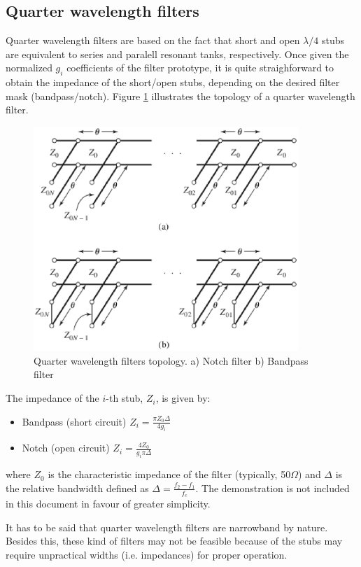\subsection{Quarter wavelength filters}

Quarter wavelength filters are based on the fact that short and open $\lambda/4$ stubs are equivalent to series and paralell resonant tanks, respectively. Once given the normalized $g_i$ coefficients of the filter prototype, it is quite straighforward to obtain the impedance of the short/open stubs, depending on the desired filter mask (bandpass/notch). Figure \ref{eq:QWfilter} illustrates the topology of a quarter wavelength filter.\\

\begin{figure}[H]
\centering
\includegraphics[width=100mm]{QuarterWavelengthFilter.eps}
\caption{Quarter wavelength filters topology. a) Notch filter b) Bandpass filter \cite{Pozar}}
\label{eq:QWfilter}
\end{figure}

\noindent The impedance of the $i$-th stub, $Z_i$, is given by:

\begin{itemize}
\item{Bandpass (short circuit)} $Z_i = \frac{\pi Z_0 \Delta}{4g_i}$
\item{Notch (open circuit)} $Z_i = \frac{4 Z_0 }{g_i\pi \Delta}$
\end{itemize} 

\noindent where $Z_0$ is the characteristic impedance of the filter (typically, 50$\Omega$) and $\Delta$ is the relative bandwidth defined as $\Delta = \frac{f_2 - f_1}{f_c}$. The demonstration \cite{Pozar} is not included in this document in favour of greater simplicity. 

\noindent It has to be said that quarter wavelength filters are narrowband by nature. Besides this, these kind of filters may not be feasible because of the stubs may require unpractical widths (i.e. impedances) for proper operation.

